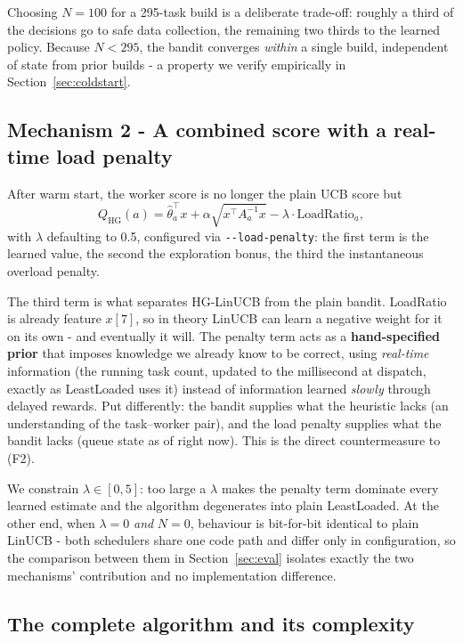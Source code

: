 \documentclass[final,5p,times,twocolumn]{elsarticle}
\begin{document}
Choosing $N=100$ for a 295-task build is a deliberate trade-off: roughly a third of the decisions go to safe data collection, the remaining two thirds to the learned policy. Because $N<295$, the bandit converges \emph{within} a single build, independent of state from prior builds - a property we verify empirically in Section~\ref{sec:coldstart}.

\subsection{Mechanism 2 - A combined score with a real-time load penalty}
\label{sec:mech2}

After warm start, the worker score is no longer the plain UCB score but
\begin{equation}
Q_{\text{HG}}(a)=\hat{\theta}_a^\top x+\alpha\sqrt{x^\top A_a^{-1}x}-\lambda\cdot\text{LoadRatio}_a,
\end{equation}
with $\lambda$ defaulting to 0.5, configured via \texttt{-{}-load-penalty}: the first term is the learned value, the second the exploration bonus, the third the instantaneous overload penalty.

The third term is what separates HG-LinUCB from the plain bandit. LoadRatio is already feature $x[7]$, so in theory LinUCB can learn a negative weight for it on its own - and eventually it will. The penalty term acts as a \textbf{hand-specified prior} that imposes knowledge we already know to be correct, using \emph{real-time} information (the running task count, updated to the millisecond at dispatch, exactly as LeastLoaded uses it) instead of information learned \emph{slowly} through delayed rewards. Put differently: the bandit supplies what the heuristic lacks (an understanding of the task--worker pair), and the load penalty supplies what the bandit lacks (queue state as of right now). This is the direct countermeasure to (F2).

We constrain $\lambda\in[0,5]$: too large a $\lambda$ makes the penalty term dominate every learned estimate and the algorithm degenerates into plain LeastLoaded. At the other end, when $\lambda=0$ \emph{and} $N=0$, behaviour is bit-for-bit identical to plain LinUCB - both schedulers share one code path and differ only in configuration, so the comparison between them in Section~\ref{sec:eval} isolates exactly the two mechanisms' contribution and no implementation difference.

\subsection{The complete algorithm and its complexity}
\label{sec:algo}
\end{document}
